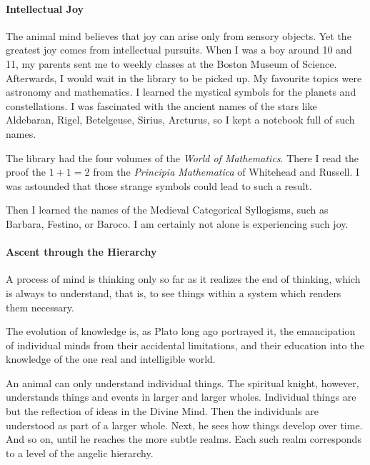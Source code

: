 \paragraph{Intellectual Joy}
The animal mind believes that joy can arise only from sensory objects. Yet the greatest joy comes from intellectual pursuits. When I was a boy around 10 and 11, my parents sent me to weekly classes at the Boston Museum of Science. Afterwards, I would wait in the library to be picked up. My favourite topics were astronomy and mathematics. I learned the mystical symbols for the planets and constellations. I was fascinated with the ancient names of the stars like Aldebaran, Rigel, Betelgeuse, Sirius, Arcturus, so I kept a notebook full of such names.

The library had the four volumes of the \emph{World of Mathematics}. There I read the proof the $1+1=2$ from the \emph{Principia Mathematica} of Whitehead and Russell. I was astounded that those strange symbols could lead to such a result.

Then I learned the names of the Medieval Categorical Syllogisms, such as Barbara, Festino, or Baroco. I am certainly not alone is experiencing such joy.

\paragraph{Ascent through the Hierarchy}
\begin{quotex}
A process of mind is thinking only so far as it realizes the end of thinking, which is always to understand, that is, to see things within a system which renders them necessary. 

The evolution of knowledge is, as Plato long ago portrayed it, the emancipation of individual minds from their accidental limitations, and their education into the knowledge of the one real and intelligible world. 

\end{quotex}
An animal can only understand individual things. The spiritual knight, however, understands things and events in larger and larger wholes. Individual things are but the reflection of ideas in the Divine Mind. Then the individuals are understood as part of a larger whole. Next, he sees how things develop over time. And so on, until he reaches the more subtle realms. Each such realm corresponds to a level of the angelic hierarchy.

